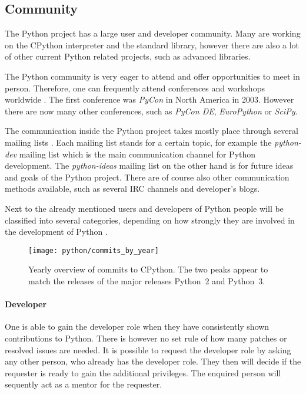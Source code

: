 
\subsection{Community} %

The Python project has a large user and developer community. Many are working
on the CPython interpreter and the standard library, however there are also a
lot of other current Python related projects, such as advanced libraries.

The Python community is very eager to attend and offer opportunities to meet in
person. Therefore, one can frequently attend conferences and workshops
worldwide \cite{PythonConferences}. The first conference was \emph{PyCon} in
North America in 2003. However there are now many other conferences, such as
\emph{PyCon DE}, \emph{EuroPython} or \emph{SciPy}.

The communication inside the Python project takes mostly place through several
mailing lists \cite{PythonCommunication}. Each mailing list stands for a
certain topic, for example the \emph{python-dev} mailing list which is the main
communication channel for Python development. The \emph{python-ideas} mailing
list on the other hand is for future ideas and goals of the Python project.
There are of course also other communication methods available, such as several
\ac{IRC} channels and developer's blogs.

Next to the already mentioned users and developers of Python people will be
classified into several categories, depending on how strongly they are involved
in the development of Python \cite{PythonCoreDeveloper}.

\begin{figure}[htbp]
  \centering
  \texttt{[image: python/commits\_by\_year]}
  \caption[Commits by Year, Python]
  {Yearly overview of commits to CPython. The two peaks appear to match the
    releases of the major releases Python~2 and Python~3.}
  \label{fig:python:cby}
\end{figure}

\paragraph{Developer}

One is able to gain the developer role when they have consistently shown
contributions to Python. There is however no set rule of how many patches or
resolved issues are needed. It is possible to request the developer role by
asking any other person, who already has the developer role. They then will
decide if the requester is ready to gain the additional privileges. The
enquired person will sequently act as a mentor for the requester.

